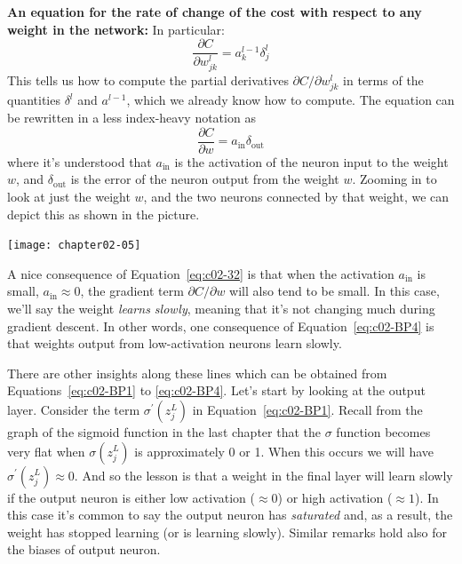\textbf{An equation for the rate of change of the cost with respect to any weight in the network:} 
In particular: 
\begin{equation}
\frac{\partial C}{\partial w_{j k}^{l}}=a_{k}^{l-1} \delta_{j}^{l}
\label{eq:c02-BP4}
\end{equation}
This tells us how to compute the partial derivatives $\partial C / \partial w_{j k}^{l}$ in terms of the quantities $\delta^{l}$ and $a^{l-1}$, which we already know how to compute. The equation can be rewritten in a less index-heavy notation as 
\begin{equation}
\frac{\partial C}{\partial w}=a_{\mathrm{in}} \delta_{\mathrm{out}}
\label{eq:c02-32}
\end{equation}
where it's understood that $a_\textrm{in}$ is the activation of the neuron input to the weight $w$, and $\delta_\textrm{out}$ is the error of the neuron output from the weight $w$. Zooming in to look at just the weight $w$, and the two neurons connected by that weight, we can depict this as shown in the picture.

\begin{marginfigure}
\texttt{[image: chapter02-05]}
\end{marginfigure}

A nice consequence of Equation~\ref{eq:c02-32} is that when the activation $a_\textrm{in}$ is small, $a_{\mathrm{in}} \approx 0$, the gradient term $\partial C / \partial w$ will also tend to be small. In this case, we'll say the weight \textit{learns slowly}, meaning that it's not changing much during gradient descent. In other words, one consequence of Equation~\ref{eq:c02-BP4} is that weights output from low-activation neurons learn slowly.

There are other insights along these lines which can be obtained from Equations~\ref{eq:c02-BP1} to \ref{eq:c02-BP4}. Let's start by looking at the output layer.  Consider the term $\sigma^{\prime}\left(z_{j}^{L}\right)$ in Equation~\ref{eq:c02-BP1}. Recall from the graph of the sigmoid function in the last chapter that the $\sigma$ function becomes very flat when $\sigma\left(z_{j}^{L}\right)$ is approximately 0 or 1. When this occurs we will have $\sigma^{\prime}\left(z_{j}^{L}\right) \approx 0$. And so the lesson is that a weight in the final layer will learn slowly if the output neuron is either low activation ($\approx 0 $) or high activation ($\approx 1$). In this case it's common to say the output neuron has \textit{saturated} and, as a result, the weight has stopped learning (or is learning slowly). Similar remarks hold also for the biases of output neuron.


